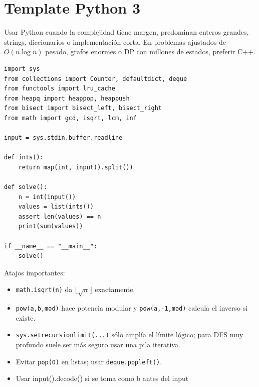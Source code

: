 \section{Template Python 3}

Usar Python cuando la complejidad tiene margen, predominan enteros grandes,
strings, diccionarios o implementaci\'on corta. En problemas ajustados de
$O(n\log n)$ pesado, grafos enormes o DP con millones de estados, preferir C++.

\begin{lstlisting}[style=py]
import sys
from collections import Counter, defaultdict, deque
from functools import lru_cache
from heapq import heappop, heappush
from bisect import bisect_left, bisect_right
from math import gcd, isqrt, lcm, inf

input = sys.stdin.buffer.readline

def ints():
    return map(int, input().split())

def solve():
    n = int(input())
    values = list(ints())
    assert len(values) == n
    print(sum(values))

if __name__ == "__main__":
    solve()
\end{lstlisting}

Atajos importantes:
\begin{itemize}
  \item \texttt{math.isqrt(n)} da $\lfloor\sqrt n\rfloor$ exactamente.
  \item \texttt{pow(a,b,mod)} hace potencia modular y
  \texttt{pow(a,-1,mod)} calcula el inverso si existe.
  \item \texttt{sys.setrecursionlimit(...)} s\'olo ampl\'ia el l\'imite l\'ogico;
  para DFS muy profundo suele ser m\'as seguro usar una pila iterativa.
  \item Evitar \texttt{pop(0)} en listas; usar \texttt{deque.popleft()}.
  \item Usar input().decode() si se toma como b antes del input
\end{itemize}
